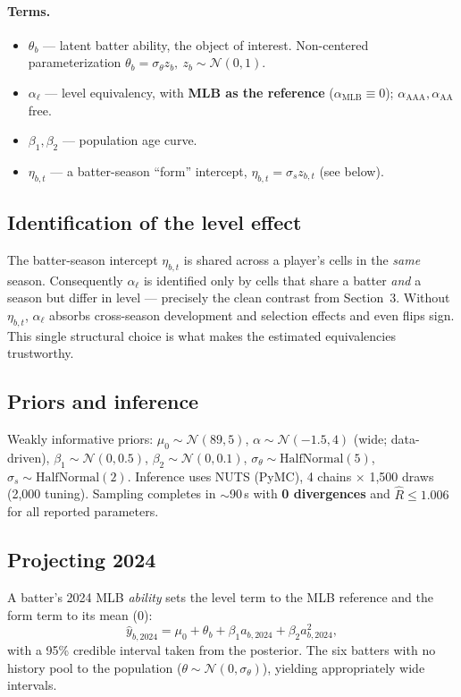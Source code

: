 \documentclass[11pt]{article}
\begin{document}
\paragraph{Terms.}
\begin{itemize}
  \item $\theta_b$ --- latent batter ability, the object of interest. Non-centered
        parameterization $\theta_b=\sigma_\theta z_b,\ z_b\sim\mathcal N(0,1)$.
  \item $\alpha_\ell$ --- level equivalency, with \textbf{MLB as the reference}
        ($\alpha_{\text{MLB}}\equiv 0$); $\alpha_{\text{AAA}},\alpha_{\text{AA}}$ free.
  \item $\beta_1,\beta_2$ --- population age curve.
  \item $\eta_{b,t}$ --- a batter-season ``form'' intercept,
        $\eta_{b,t}=\sigma_s z_{b,t}$ (see below).
\end{itemize}

\subsection{Identification of the level effect}\label{sec:ident}
The batter-season intercept $\eta_{b,t}$ is shared across a player's cells in the
\emph{same} season. Consequently $\alpha_\ell$ is identified only by cells that share
a batter \emph{and} a season but differ in level --- precisely the clean contrast from
Section~3. Without $\eta_{b,t}$, $\alpha_\ell$ absorbs cross-season development and
selection effects and even flips sign. This single structural choice is what makes
the estimated equivalencies trustworthy.

\subsection{Priors and inference}
Weakly informative priors: $\mu_0\sim\mathcal N(89,5)$,
$\alpha\sim\mathcal N(-1.5,4)$ (wide; data-driven),
$\beta_1\sim\mathcal N(0,0.5)$, $\beta_2\sim\mathcal N(0,0.1)$,
$\sigma_\theta\sim\text{HalfNormal}(5)$, $\sigma_s\sim\text{HalfNormal}(2)$.
Inference uses NUTS (PyMC), 4 chains $\times$ 1{,}500 draws (2{,}000 tuning).
Sampling completes in $\sim$90\,s with \textbf{0 divergences} and
$\hat R\le 1.006$ for all reported parameters.

\subsection{Projecting 2024}
A batter's 2024 MLB \emph{ability} sets the level term to the MLB reference and the
form term to its mean (0):
\begin{equation}
\hat y_{b,2024} = \mu_0 + \theta_b + \beta_1 a_{b,2024} + \beta_2 a_{b,2024}^2,
\end{equation}
with a 95\% credible interval taken from the posterior. The six batters with no
history pool to the population ($\theta\sim\mathcal N(0,\sigma_\theta)$), yielding
appropriately wide intervals.
\end{document}
